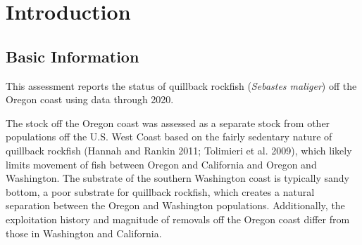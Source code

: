 \documentclass[11pt,
  english,
  a4paper,
]{article}
\begin{document}
\newcommand{\lt}{\ensuremath <}
\newcommand{\gt}{\ensuremath >}


\setcounter{page}{1}

\renewcommand{\thetable}{\roman{table}}
\renewcommand{\thefigure}{\roman{figure}}

\setlength\parskip{0.5em plus 0.1em minus 0.2em}

\vspace{500cm}

\pagebreak

\pagebreak
\setlength{\parskip}{5mm plus1mm minus1mm}
\setcounter{page}{1}
\renewcommand{\thetable}{\arabic{table}}
\renewcommand{\thefigure}{\arabic{figure}}
\setcounter{table}{0}
\setcounter{figure}{0}

\setlength\parskip{0.5em plus 0.1em minus 0.2em}


\hypertarget{introduction}{%
\section{Introduction}\label{introduction}}

\leavevmode\tagmcend\tagstructend


\hypertarget{basic-information}{%
\subsection{Basic Information}\label{basic-information}}

\leavevmode\tagmcend\tagstructend


This assessment reports the status of quillback rockfish (\emph{Sebastes maliger}) off the Oregon coast using data through 2020.

\leavevmode\tagmcend\tagstructend\par


The stock off the Oregon coast was assessed as a separate stock from other populations off the U.S. West Coast based on the fairly sedentary nature of quillback rockfish {(Hannah and Rankin 2011; Tolimieri et al. 2009)\leavevmode\tagmcend\tagstructend}, which likely limits movement of fish between Oregon and California and Oregon and Washington. The substrate of the southern Washington coast is typically sandy bottom, a poor substrate for quillback rockfish, which creates a natural separation between the Oregon and Washington populations. Additionally, the exploitation history and magnitude of removals off the Oregon coast differ from those in Washington and California.
\end{document}
